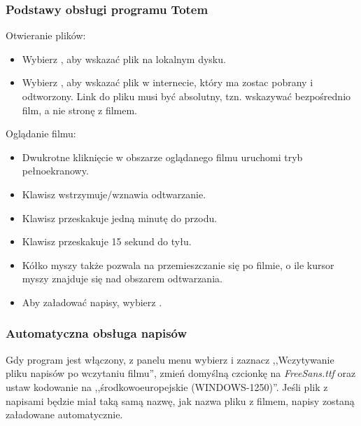 \subsubsection{Podstawy obsługi programu Totem}
Otwieranie plików:
\begin{itemize}
\item Wybierz , aby wskazać plik na lokalnym dysku.
\item Wybierz , aby wskazać plik w internecie, który ma zostac pobrany i odtworzony. Link do pliku musi być absolutny, tzn. wskazywać bezpośrednio film, a nie stronę z filmem.
\end{itemize}
Oglądanie filmu:
\begin{itemize}
\item Dwukrotne kliknięcie w obszarze oglądanego filmu uruchomi tryb pełnoekranowy.
\item Klawisz \keys{\Space} wstrzymuje/wznawia odtwarzanie.
\item Klawisz \keys{\arrowkeyright} przeskakuje jedną minutę do przodu.
\item Klawisz \keys{\arrowkeyleft} przeskakuje 15 sekund do tyłu.
\item Kółko myszy także pozwala na przemieszczanie się po filmie, o ile kursor myszy znajduje się nad obszarem odtwarzania.
\item Aby załadować napisy, wybierz .
\end{itemize}

\subsubsection{Automatyczna obsługa napisów}
Gdy program jest włączony, z panelu menu wybierz  i zaznacz ,,Wczytywanie pliku napisów po wczytaniu filmu'', zmień domyślną czcionkę na \textit{FreeSans.ttf} oraz ustaw kodowanie na ,,środkowoeuropejskie (WINDOWS-1250)''. Jeśli plik z napisami będzie miał taką samą nazwę, jak nazwa pliku z filmem, napisy zostaną załadowane automatycznie.
\clearpage
